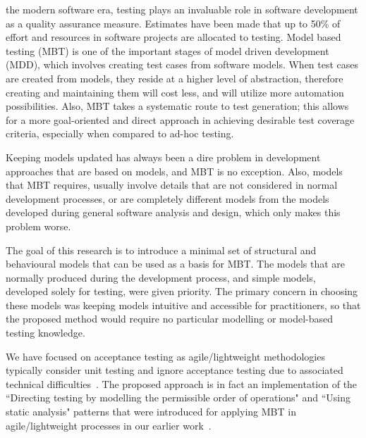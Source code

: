 %
%
\label{sec:introduction}
 the modern software era, testing plays an invaluable role in software development as a quality assurance measure. Estimates have been made that up to 50\% of effort and resources in software projects are allocated to testing. Model based testing (MBT) is one of the important stages of model driven development (MDD), which involves creating test cases from software models. When test cases are created from models, they reside at a higher level of abstraction, therefore creating and maintaining them will cost less, and will utilize more automation possibilities. Also, MBT takes a systematic route to test generation; this allows for a more goal-oriented and direct approach in achieving desirable test coverage criteria, especially when compared to ad-hoc testing. 

Keeping models updated has always been a dire problem in development approaches that are based on models, and MBT is no exception. Also, models that MBT requires, usually involve details that are not considered in normal development processes, or are completely different models from the models developed during general software analysis and design, which only makes this problem worse.

The goal of this research is to introduce a minimal set of structural and behavioural models that can be used as a basis for MBT. The models that are normally produced during the development process, and simple models, developed solely for testing, were given priority. The primary concern in choosing these models was keeping models intuitive and accessible for practitioners, so that the proposed method would require no particular modelling or model-based testing knowledge. 

We have focused on acceptance testing as agile/lightweight methodologies typically consider unit testing and ignore acceptance testing due to associated technical difficulties~\cite{Ambler2008,Ambler}.
The proposed approach is in fact an implementation of  the ``Directing testing by modelling the permissible order of operations" and ``Using static analysis" patterns that were introduced for applying MBT in agile/lightweight processes in our earlier work~\cite{Jalalinasab2012}.

